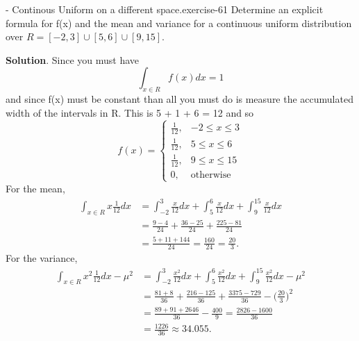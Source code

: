 \documentclass[10pt,]{book}
\numberwithin{equation}{section}
\begin{document}
%
\par
\hypertarget{p-869}{}%
\begin{inlineexercise}{- Continous Uniform on a different space.}{exercise-61}%
\hypertarget{p-870}{}%
Determine an explicit formula for f(x) and the mean and variance for a continuous uniform distribution over \(R = [-2,3] \cup [5,6] \cup [9,15]\).%
\par\smallskip%
\noindent\textbf{Solution}.\hypertarget{solution-25}{}\quad%
\hypertarget{p-871}{}%
Since you must have%
\begin{equation*}
\int_{x \in R} f(x) dx = 1
\end{equation*}
and since f(x) must be constant than all you must do is measure the accumulated width of the intervals in R. This is 5 + 1 + 6 = 12 and so%
\begin{equation*}
f(x)=\left\{\begin{matrix}
\frac{1}{12}, & -2 \le x \le 3
\\ \frac{1}{12}, & 5 \le x \le 6
\\ \frac{1}{12}, & 9 \le x \le 15
\\ 0, & \text{otherwise}
\end{matrix}\right.
\end{equation*}
For the mean,%
\begin{align*}
\int_{x \in R} x \frac{1}{12} dx & = \int_{-2}^3 \frac{x}{12} dx + \int_5^6 \frac{x}{12} dx + \int_9^{15} \frac{x}{12} dx\\
& = \frac{9-4}{24} + \frac{36-25}{24} + \frac{225-81}{24}\\
& = \frac{5+11+144}{24} = \frac{160}{24} = \frac{20}{3}.
\end{align*}
For the variance,%
\begin{align*}
\int_{x \in R} x^2 \frac{1}{12} dx - \mu^2 & = \int_{-2}^3 \frac{x^2}{12} dx + \int_5^6 \frac{x^2}{12} dx + \int_9^{15} \frac{x^2}{12} dx - \mu^2\\
& = \frac{81+8}{36} + \frac{216-125}{36} + \frac{3375-729}{36} - \big ( \frac{20}{3} \big )^2\\
& = \frac{89+91+2646}{36} - \frac{400}{9} = \frac{2826-1600}{36} \\
& = \frac{1226}{36} \approx	34.055.
\end{align*}
%
\end{inlineexercise}
%
\par
\hypertarget{p-872}{}%
\end{document}
